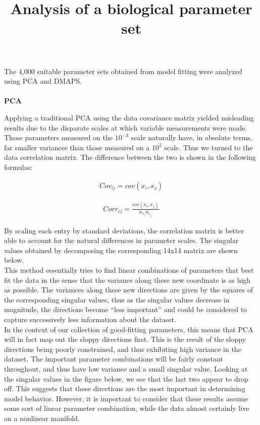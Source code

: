 \documentclass[12pt]{article}
\begin{document}
\title{Analysis of a biological parameter set}
\maketitle

The 4,000 suitable parameter sets obtained from model fitting were analyzed using PCA and DMAPS. \\ \\

\textbf{PCA}

Applying a traditional PCA using the data covariance matrix yielded misleading results due to the disparate scales at which variable measurements were made. Those parameters measured on the $10^{-3}$ scale naturally have, in absolute terms, far smaller variances than those measured on a $10^2$ scale. Thus we turned to the data correlation matrix. The difference between the two is shown in the following formulas:


\begin{align*}
  Cov_{ij} = cov(x_i, x_j)
\end{align*}

\begin{align*}
  Corr_{ij} = \frac{cov(x_i, x_j)}{\sigma_{x_i} \sigma_{x_j}}
\end{align*}

By scaling each entry by standard deviations, the correlation matrix is better able to account for the natural differences in parameter scales. The singular values obtained by decomposing the corresponding 14x14 matrix are shown below. \\

This method essentially tries to find linear combinations of parameters that best fit the data in the sense that the variance along these new coordinate is as high as possible. The variances along these new directions are given by the squares of the corresponding singular values, thus as the singular values decrease in magnitude, the directions become ``less important'' and could be considered to capture successively less information about the dataset. \\

In the context of our collection of good-fitting parameters, this means that PCA will in fact map out the sloppy directions first. This is the result of the sloppy directions being poorly constrained, and thus exhibiting high variance in the dataset. The important parameter combinations will be fairly constant throughout, and thus have low variance and a small singular value. Looking at the singular values in the figure below, we see that the last two appear to drop off. This suggests that these directions are the most important in determining model behavior. However, it is important to consider that these results assume some sort of linear parameter combination, while the data almost certainly live on a nonlinear manifold.
\end{document}
